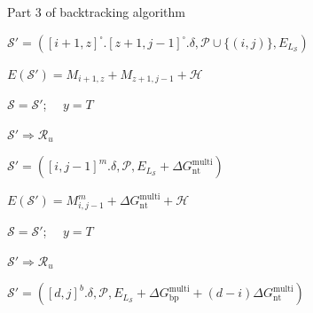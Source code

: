 \documentclass[11pt,letterpaper]{article}  \usepackage[margin=1in]{geometry}
\theoremstyle{definition}  \newtheorem{Definition}[theorem]{Definition}
\begin{document}
\begin{algorithm}
	\caption*{Part 3 of backtracking algorithm}
	\begin{algorithmic}[1]
		\footnotesize
		
		
		
		
		\State  $\mathcal{S}' = ([i+1,z]^\square.[z+1,j-1]^\square.\delta, \mathcal{P} \cup \{(i,j)\}, E_{L_{\mathcal{S}}})$
		
		\State $E(\mathcal{S}')  = M_{i+1,z} +  M_{z+1,j-1} + \mathcal{H}$
		
		
		
		
		
		\State $\mathcal{S} = \mathcal{S}'$; \ \  $y = T$
		
		\Else
		
		\State $\mathcal{S}' \Rightarrow \mathcal{R}_u$		
		\EndIf
		\EndIf
		\EndFor
		
		\EndIf
		
		
		
		
		
		\State $\mathcal{S}' = ([i,j-1]^m.\delta, \mathcal{P}, E_{L_{\mathcal{S}}} + \Delta G_\text{nt}^\text{multi})$ 
		
		\State $E(\mathcal{S}')  = M_{i,j-1}^m + \Delta G_\text{nt}^\text{multi} + \mathcal{H}$
		
		
		
		
		
		\State $\mathcal{S} = \mathcal{S}'$; \ \  $y = T$
		
		\Else
		
		\State $\mathcal{S}' \Rightarrow \mathcal{R}_u$		
		\EndIf
		
		\EndIf
		
		\EndIf
		
		
		
		\State $\mathcal{S}' = ([d,j]^b.\delta, \mathcal{P}, E_{L_{\mathcal{S}}} + \Delta G_\text{bp}^\text{multi} + (d-i) \Delta G_\text{nt}^\text{multi})$ 
		

\end{algorithmic}
\end{algorithm}
\end{document}
